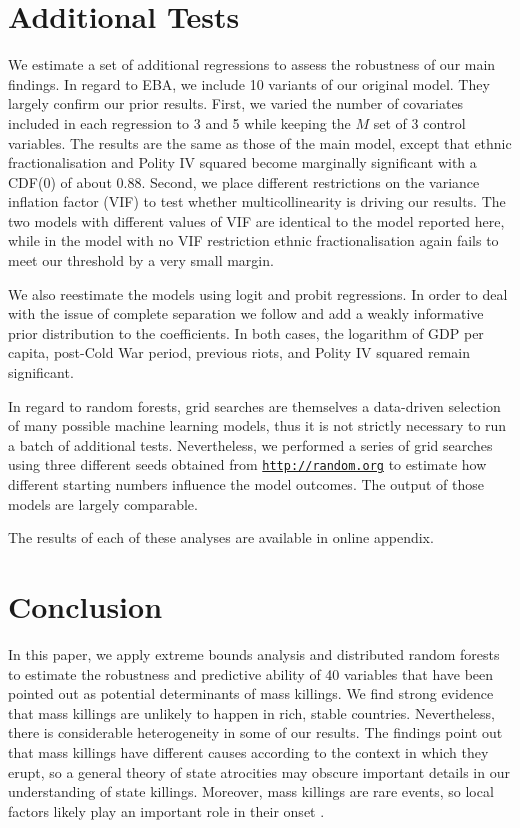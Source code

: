 \documentclass[a4paper,12pt]{article}
\begin{document}
\section{Additional Tests}
\label{sec:additional-tests}
	
We estimate a set of additional regressions to assess the robustness of our main findings. In regard to EBA, we include 10 variants of our original model. They largely confirm our prior results. First, we varied the number of covariates included in each regression to 3 and 5 while keeping the $M$ set of 3 control variables. The results are the same as those of the main model, except that ethnic fractionalisation and Polity IV squared become marginally significant with a CDF(0) of about 0.88. Second, we place different restrictions on the variance inflation factor (VIF) to test whether multicollinearity is driving our results. The two models with different values of VIF are identical to the model reported here, while in the model with no VIF restriction ethnic fractionalisation again fails to meet our threshold by a very small margin. 
	
We also reestimate the models using logit and probit regressions. In order to deal with the issue of complete separation \citep{bell2015questioning,zorn2005solution} we follow \citet{gelman2008weakly} and add a weakly informative prior distribution to the coefficients. In both cases, the logarithm of GDP per capita, post-Cold War period, previous riots, and Polity IV squared remain significant. 
	
In regard to random forests, grid searches are themselves a data-driven selection of many possible machine learning models, thus it is not strictly necessary to run a batch of additional tests. Nevertheless, we performed a series of grid searches using three different seeds obtained from \href{https://random.org}{\texttt{http://random.org}} to estimate how different starting numbers influence the model outcomes. The output of those models are largely comparable.
	
The results of each of these analyses are available in online appendix.

\section{Conclusion}
\label{sec:conclusion}
	
In this paper, we apply extreme bounds analysis and distributed random forests to estimate the robustness and predictive ability of 40 variables that have been pointed out as potential determinants of mass killings. We find strong evidence that mass killings are unlikely to happen in rich, stable countries. Nevertheless, there is considerable heterogeneity in some of our results. The findings point out that mass killings have different causes according to the context in which they erupt, so a general theory of state atrocities may obscure important details in our understanding of state killings. Moreover, mass killings are rare events, so local factors likely play an important role in their onset \citep{straus2007second,straus2012destroy}.
	
\end{document}
